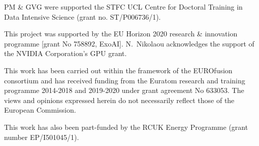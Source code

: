 {\footnotesize
PM \& GVG were supported the STFC UCL Centre for Doctoral Training in Data Intensive
Science (grant no. ST/P006736/1).

This project was supported by the EU Horizon 2020 research \& innovation
programme [grant No 758892, ExoAI]. N.~Nikolaou acknowledges the support of the NVIDIA Corporation’s GPU grant.

This work has been carried out within the framework of the EUROfusion consortium and has received funding from the Euratom research and training programme 2014-2018 and 2019-2020 under grant agreement No 633053. The views and opinions expressed herein do not necessarily reflect those of the European Commission.

This work has also been part-funded by the RCUK Energy Programme (grant number EP/I501045/1).
}
